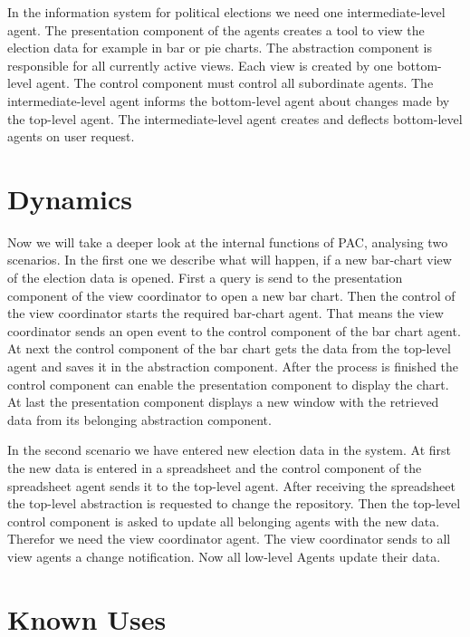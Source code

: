 \documentclass{scrbook}
\begin{document}
In the information system for political elections we need one intermediate-level agent. The presentation component of the agents creates a tool to view the election data for example in bar or pie charts.  The abstraction component is responsible for all currently active views. Each view is created by one bottom-level agent. The control component must control all subordinate agents. The intermediate-level agent informs the bottom-level agent about changes made by the top-level agent. The intermediate-level agent creates and deflects bottom-level agents on user request. 


\section{Dynamics}	%

Now we will take a deeper look at the internal functions of PAC, analysing two scenarios.  In the first one we describe what will happen, if a new bar-chart view of the election data is opened.
First a query is send to the presentation component of the view coordinator to open a new bar chart. Then the control of the view coordinator starts the required bar-chart agent. That means the view coordinator sends an open event to the control component of the bar chart agent. At next the control component of the bar chart gets the data from the top-level agent and saves it in the abstraction component. After the process is finished the control component can enable the presentation component to display the chart. At last the presentation component displays a new window with the retrieved data from its belonging abstraction component.


In the second scenario we have entered new election data in the system.  At first the new data is entered in a spreadsheet and the control component of the spreadsheet agent sends it to the top-level agent. After receiving the spreadsheet the top-level abstraction is requested to change the repository. Then the top-level control component is asked to update all belonging agents with the new data. Therefor we need the view coordinator agent. The view coordinator sends to all view agents a change notification. Now all low-level Agents update their data.  


\section{Known Uses}
\end{document}
